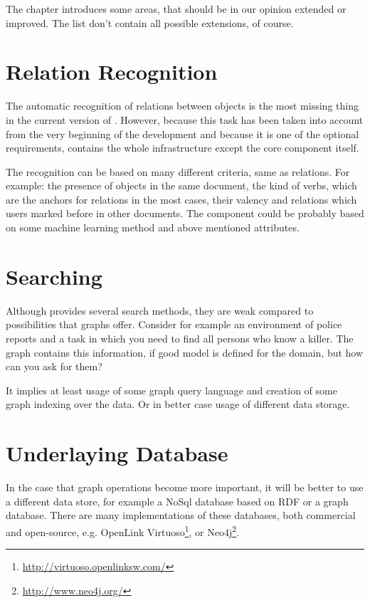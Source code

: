 
The chapter introduces some areas, that should be in our opinion extended or improved.
The list don't contain all possible extensions, of course.

\section{Relation Recognition}
The automatic recognition of relations between objects is the most missing thing
in the current version of \textan{}. However, because this task has been taken
into account from the very beginning of the development and because it is one of
the optional requirements, \textan{} contains the whole infrastructure except
the core component itself.

The recognition can be based on many different criteria, same as relations.
For example: the presence of objects in the same document, the kind of verbs,
which are the anchors for relations in the most cases, their valency and
relations which users marked before in other documents. The component could be
probably based on some machine learning method and above mentioned attributes.

\section{Searching}
Although \textan{} provides several search methods, they are weak compared to
possibilities that graphs offer. Consider for example an environment of police
reports and a task in which you need to find all persons who know a killer. The
graph contains this information, if good model is defined for the domain, but
how can you ask for them?

It implies at least usage of some graph query language and creation of some
graph indexing over the data. Or in better case usage of different data storage. 

\section{Underlaying Database}
In the case that graph operations become more important, it will be better to use
a different data store, for example a NoSql database based on RDF or a graph
database. There are many implementations of these databases, both commercial and
open-source, e.g. OpenLink Virtuoso\footnote{\url{http://virtuoso.openlinksw.com/}},
or Neo4j\footnote{\url{http://www.neo4j.org/}}.

